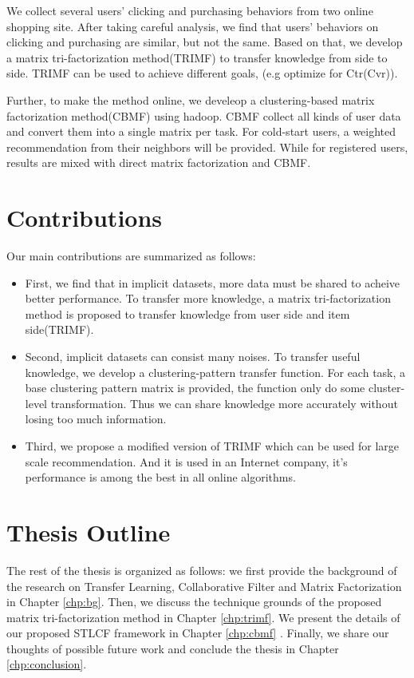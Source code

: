We collect several users' clicking and purchasing behaviors from two online shopping site. After taking careful analysis, we find that users' behaviors on clicking and purchasing are similar, but not the same. Based on that, we develop a matrix tri-factorization method(TRIMF) to transfer knowledge from side to side. TRIMF can be used to achieve different goals, (e.g optimize for Ctr(Cvr)).

Further, to make the method online, we develeop a clustering-based matrix factorization method(CBMF) using hadoop. CBMF collect all kinds of user data and convert them into a single matrix per task. For cold-start users, a weighted recommendation from their neighbors will be provided. While for registered users, results are mixed with direct matrix factorization and CBMF.

\hspace{0.1in}
\section{Contributions}

Our main contributions are summarized as follows:

\begin{itemize}[noitemsep,topsep=0pt,parsep=0pt,partopsep=0pt]
\item First, we find that in implicit datasets, more data must be shared to acheive better performance. To transfer more knowledge, a matrix tri-factorization method is proposed to transfer knowledge from user side and item side(TRIMF).
\item Second, implicit datasets can consist many noises. To transfer useful knowledge, we develop a clustering-pattern transfer function. For each task, a base clustering pattern matrix is provided, the function only do some cluster-level transformation. Thus we can share knowledge more accurately without losing too much information.
\item Third, we propose a modified version of TRIMF which can be used for large scale recommendation. And it is used in an Internet company, it's performance is among the best in all online algorithms.
\end{itemize}

\hspace{0.1in}
\section{Thesis Outline}

The rest of the thesis is organized as follows: we first provide the background of the research on Transfer Learning, Collaborative Filter and Matrix Factorization in Chapter \ref{chp:bg}. Then, we discuss the technique grounds of the proposed matrix tri-factorization method in Chapter \ref{chp:trimf}. We present the details of our proposed STLCF framework in Chapter \ref{chp:cbmf} . Finally, we share our thoughts of possible future work and conclude the thesis in Chapter \ref{chp:conclusion}.



